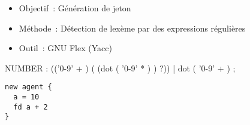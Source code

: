 \begin{frame}
	\begin{itemize}
		\item Objectif~: Génération de jeton
		\item Méthode~: Détection de lexème par des expressions régulières
		\item Outil~: GNU Flex (Yacc)
	\end{itemize}
\end{frame}

\begin{frame}[fragile]
	\begin{rail}
		NUMBER : (('0-9' + ) ( (dot ( '0-9' * ) ) ?))
		| dot ( '0-9' + ) ;
	\end{rail}
\end{frame}

\begin{frame}[fragile]
	\begin{lstlisting}[language=Stibbons]
new agent {
  a = 10
  fd a + 2
}
	\end{lstlisting}
\end{frame}
